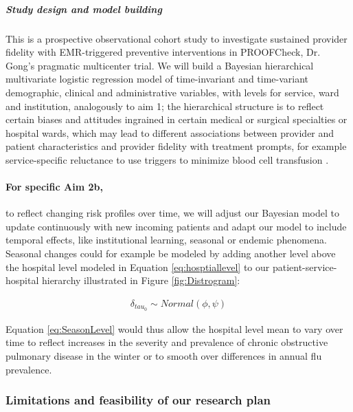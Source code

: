 \documentclass[11pt,notitlepage]{article}
\begin{document}
\subparagraph*{Study design and model building}
This is a prospective observational cohort study to investigate sustained provider fidelity with EMR-triggered preventive interventions in PROOFCheck, Dr. Gong's pragmatic multicenter trial. We will build a Bayesian hierarchical multivariate logistic regression model of time-invariant and time-variant demographic, clinical  and administrative variables, with levels for service, ward and institution, analogously to aim 1; the hierarchical structure is to reflect certain biases and attitudes ingrained in certain medical or surgical specialties or hospital wards, which may lead to different associations between provider and patient characteristics and provider fidelity with treatment prompts, for example service-specific reluctance to use triggers to minimize blood cell transfusion \cite{Goodnough_23706801}. 

\paragraph*{For specific Aim 2b,} to reflect changing risk profiles over time, we will adjust our Bayesian model to update continuously with new incoming patients and adapt our model to include temporal effects, like institutional learning, seasonal or endemic phenomena. Seasonal changes could for example be modeled by adding another level above the hospital level modeled in Equation \ref{eq:hosptiallevel} to our patient-service-hospital hierarchy illustrated in Figure \ref{fig:Distrogram}:

\begin{figure}
\vspace{-20pt}
\begin{align}\label{eq:SeasonLevel}
\delta_{tau_{0}} \sim Normal(\phi, \psi) 
\end{align}
   \vspace{-30pt}
\end{figure}

\vspace{10pt}
Equation \ref{eq:SeasonLevel} would thus allow the hospital level mean to vary over time to reflect increases in the severity and prevalence of chronic obstructive pulmonary disease in the winter or to smooth over differences in annual flu prevalence. 
 
\subsubsection*{Limitations and feasibility of our research plan }
\end{document}
